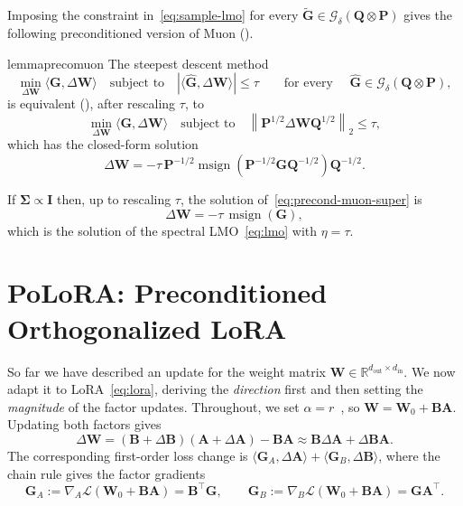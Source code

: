 \documentclass{article}
\newcommand{\mat}[1]{\bm{#1}}
\newcommand{\R}{\mathbb{R}}
\newcommand{\ip}[1]{\langle #1 \rangle}
\DeclareMathOperator{\msign}{msign}          %
\newcommand{\methodname}{PoLoRA\xspace}
\begin{document}
Imposing the constraint in~\eqref{eq:sample-lmo} for every $\widetilde{\mat{G}}\in\mathcal{G}_\delta(\mat{Q} \otimes \mat{P})$ gives the following preconditioned version of Muon ().

\begin{restatable}{lemma}{precomuon}
\label{lem:precond-muon}
The steepest descent method
\begin{equation}\label{eq:precond-muon-super}
    \min_{\Delta\mat{W}} \ip{\mat{G}, \Delta\mat{W}} \quad \mbox{subject to} \quad |\ip{\hat{\mat{G}},\Delta\mat{W}}| \le \tau \qquad \text{for  every } \quad\hat{\mat{G}} \in \mathcal{G}_\delta(\mat{Q} \otimes \mat{P}),
\end{equation}
is equivalent (), after rescaling $\tau$, to
\begin{equation}\label{eq:precond-muon-constraint}
\min_{\Delta\mat{W}} \ip{\mat{G}, \Delta\mat{W}} \quad \mbox{subject to} \quad \left\| \mat{P}^{1/2} \Delta\mat{W} \mat{Q}^{1/2} \right\|_2 \le \tau,
\end{equation}
which has the closed-form solution
\begin{equation} \label{eq:polorafull-update}
 \Delta\mat{W} = -\tau\, \mat{P}^{-1/2} \msign(\mat{P}^{-1/2} \mat{G} \mat{Q}^{-1/2}) \mat{Q}^{-1/2}.
\end{equation}
\end{restatable}
\begin{corollary}
  \label{lem:muon}
  If $\mat{\Sigma}\propto\mat{I}$ then, up to rescaling $\tau$, the solution of~\eqref{eq:precond-muon-super} is 
  \[
  \Delta\mat{W} = -\tau\,\msign(\mat{G}),
  \]
  which is the solution of the spectral LMO~\eqref{eq:lmo} with $\eta=\tau$.
\end{corollary}


\section{\texorpdfstring{\methodname{}}{PoLoRA}: Preconditioned Orthogonalized LoRA}
\label{sec:method}

So far we have described an update for the weight matrix $\mat{W} \in \R^{d_{\mathrm{out}} \times d_{\mathrm{in}}}$.
We now adapt it to LoRA~\eqref{eq:lora}, deriving the \emph{direction} first and then setting the \emph{magnitude} of the factor updates.
Throughout, we set $\alpha=r$~\cite{loralearnsless,raschka}, 
so $\mat{W}=\mat{W}_0+\mat{B}\mat{A}$. Updating both factors gives
\begin{equation}
\Delta\mat{W} = (\mat{B} + \Delta\mat{B})(\mat{A} + \Delta\mat{A}) - \mat{B}\mat{A} 
\approx \mat{B} \Delta\mat{A} + \Delta\mat{B} \mat{A}.
\label{eq:DeltaW-lin}
\end{equation}
The corresponding first-order loss change is
$\ip{\mat{G}_A,\Delta\mat{A}}+\ip{\mat{G}_B,\Delta\mat{B}}$,
where the chain rule gives the factor gradients
\begin{equation}\label{e-grad-wrt-factors}
    \mat{G}_A := \nabla_A \mathcal{L}(\mat{W}_0+\mat{B}\mat{A})
    = \mat{B}^\top \mat{G},
    \qquad
    \mat{G}_B := \nabla_B \mathcal{L}(\mat{W}_0+\mat{B}\mat{A})
    = \mat{G}\mat{A}^\top.
\end{equation}
\end{document}
